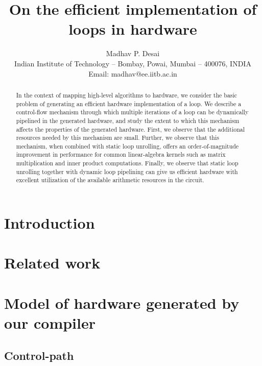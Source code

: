 \documentclass[conference]{IEEEtran}
\title{On the efficient implementation of loops in hardware}
\author{Madhav P. Desai\\
  Indian Institute of Technology -- Bombay, Powai, Mumbai -- 400076, INDIA\\
  Email: madhav@ee.iitb.ac.in }
\begin{document}
\maketitle
\thispagestyle{empty}

\begin{abstract}

  In the context of mapping high-level algorithms to hardware,
  we consider the basic problem of generating an efficient hardware 
  implementation of a loop.  We describe a control-flow mechanism through
  which multiple iterations of a loop can be dynamically pipelined in
  the generated hardware,  and study the extent to which this 
  mechanism affects the properties of the generated hardware.
  First, we observe that the additional resources needed by this
  mechanism are small.  Further, we observe that this mechanism, when
  combined with static loop unrolling, offers an order-of-magnitude improvement 
  in performance for common linear-algebra kernels such as matrix multiplication 
  and inner product computations.  Finally, we observe that static
  loop unrolling together with dynamic loop pipelining can give us
  efficient hardware with excellent utilization of the available arithmetic
  resources in the circuit.

\end{abstract}

\section{Introduction}





\section{Related work}




\section{Model of hardware generated by our compiler}


\subsection{Control-path}
\end{document}
